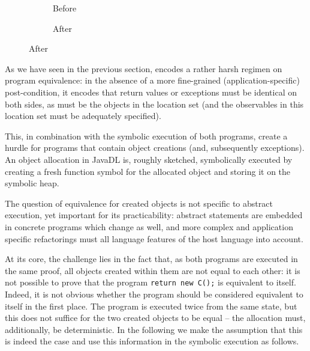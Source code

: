 
\begin{figure}
  \centering
  \begin{subfigure}{.2\linewidth}
    
    \caption{Before}
  \end{subfigure}\hspace{1cm}
  \begin{subfigure}{.2\linewidth}
    
    \caption{After}
  \end{subfigure}
\label{lst:ObjectCreation-refinity}
\end{figure}

As we have seen in the previous section, \Refinity{} encodes a rather harsh regimen on program equivalence:
in the absence of a more fine-grained (application-specific) post-condition, it encodes that return values or exceptions must be identical on both sides,
as must be the objects in the \relevant{} location set (and the observables in this location set must be adequately specified).

This, in combination with the symbolic execution of both programs, create a hurdle for programs that contain object creations (and, subsequently exceptions).
An object allocation in JavaDL is, roughly sketched, symbolically executed by creating a fresh function symbol for the allocated object and storing it on the symbolic heap.


The question of equivalence for created objects is not specific to abstract execution, yet important for its practicability: 
abstract statements are embedded in concrete programs which change as well, and more complex and application specific refactorings must all language features of the
host language into account.


At its core, the challenge lies in the fact that, as both programs are executed in the same proof, all objects created within them are not equal to each other: it is not possible to prove that the program \lstinline[style=refinity]|return new C();| is equivalent to itself.
Indeed, it is not obvious whether the program should be considered equivalent to itself in the first place.
The program is executed twice from the same state, but this does not suffice for the two created objects to be equal -- the allocation must, additionally, be deterministic.
In the following we make the assumption that this is indeed the case and use this information in the symbolic execution as follows.


